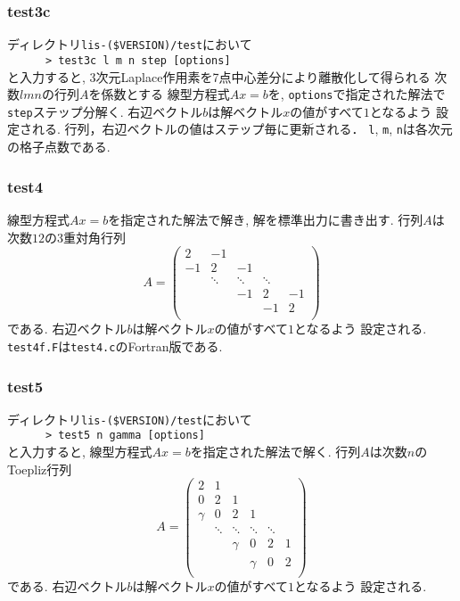 \documentclass[a4paper]{jarticle}
\begin{document}
{{\subsubsection{test3c}
ディレクトリ{\tt lis-(\$VERSION)/test}において\\
 \verb+      > test3c l m n step [options]+\\
と入力すると, 3次元Laplace作用素を7点中心差分により離散化して得られる
次数$lmn$の行列$A$を係数とする
線型方程式$Ax=b$を, {\tt options}で指定された解法で{\tt step}ステップ分解く.
右辺ベクトル$b$は解ベクトル$x$の値がすべて$1$となるよう
設定される. 行列，右辺ベクトルの値はステップ毎に更新される．
{\tt l}, {\tt m}, {\tt n}は各次元の格子点数である. 
　
\subsubsection{test4}
線型方程式$Ax=b$を指定された解法で解き, 解を標準出力に書き出す. 
行列$A$は次数$12$の3重対角行列
\[
A = 
\left(
\begin{array}{ccccc}
2 & -1 &   &  &   \\
-1 & 2 & -1 &  &   \\
  & \ddots  & \ddots  & \ddots  &   \\
  &   & -1 & 2 & -1 \\
  &   &   & -1 & 2 \\
\end{array}
\right)
\]
である. 右辺ベクトル$b$は解ベクトル$x$の値がすべて$1$となるよう
設定される. 
{\tt test4f.F}は{\tt test4.c}のFortran版である. 

\subsubsection{test5}
ディレクトリ{\tt lis-(\$VERSION)/test}において\\
 \verb+      > test5 n gamma [options]+\\
と入力すると, 
線型方程式$Ax=b$を指定された解法で解く. 
行列$A$は次数$n$のToepliz行列
\[
A = \left(
\begin{array}{cccccc}
2 & 1 &   &  &  & \\
0 & 2 & 1 &  &  & \\
\gamma & 0& 2 & 1 &  & \\
 & \ddots & \ddots & \ddots & \ddots & \\
 &  &   \gamma &0 &       2   & 1 \\
 &  &  &   \gamma & 0& 2 \\
\end{array}
\right)
\]
である. 右辺ベクトル$b$は解ベクトル$x$の値がすべて$1$となるよう
設定される. 

}}
\end{document}
